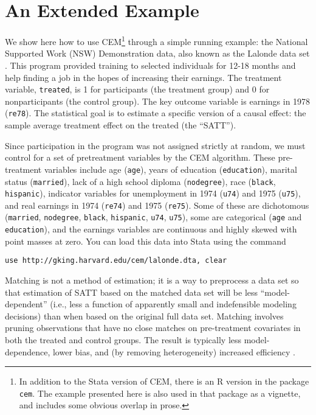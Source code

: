 \documentclass[11pt,titlepage]{article}
\begin{document}
\section{An Extended Example}
We show here how to use CEM\footnote{In addition to the Stata version
  of CEM, there is an R version in the package \texttt{cem}. The
  example presented here is also used in that package as a vignette,
  and includes some obvious overlap in prose.} through a simple
running example: the National Supported Work (NSW) Demonstration data,
also known as the Lalonde data set \citep{Lalonde86}.  This program
provided training to selected individuals for 12-18 months and help
finding a job in the hopes of increasing their earnings.  The
treatment variable, \texttt{treated}, is 1 for participants (the
treatment group) and 0 for nonparticipants (the control group).  The
key outcome variable is earnings in 1978 (\texttt{re78}).  The
statistical goal is to estimate a specific version of a causal effect:
the sample average treatment effect on the treated (the ``SATT'').

Since participation in the program was not assigned strictly at random, we
must control for a set of pretreatment variables by the CEM algorithm.
These pre-treatment variables include age (\texttt{age}), years of
education (\texttt{education}), marital status (\texttt{married}), lack of
a high school diploma (\texttt{nodegree}), race (\texttt{black},
\texttt{hispanic}), indicator variables for unemployment in 1974
(\texttt{u74}) and 1975 (\texttt{u75}), and real earnings in 1974
(\texttt{re74}) and 1975 (\texttt{re75}).  Some of these are dichotomous
(\texttt{married}, \texttt{nodegree}, \texttt{black}, \texttt{hispanic},
\texttt{u74}, \texttt{u75}), some are categorical (\texttt{age} and
\texttt{education}), and the earnings variables are continuous and highly
skewed with point masses at zero. You can load this data into Stata using
the command

\begin{verbatim}
use http://gking.harvard.edu/cem/lalonde.dta, clear
\end{verbatim}

Matching is not a method of estimation; it is a way to preprocess a
data set so that estimation of SATT based on the matched data set will
be less ``model-dependent'' (i.e., less a function of apparently small
and indefensible modeling decisions) than when based on the original
full data set.  Matching involves pruning observations that have no
close matches on pre-treatment covariates in both the treated and
control groups.  The result is typically less model-dependence, lower bias,
and (by removing heterogeneity) increased efficiency
\citep{KinZen06,HoImaKin07,IacKinPor12}.
\end{document}
